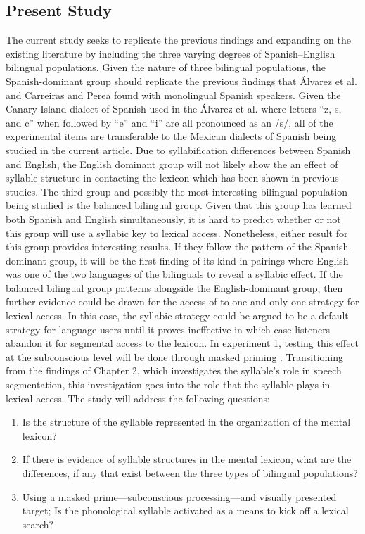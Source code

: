 \documentclass[
12pt, %
english, %
doublespacing, %
nolistspacing, %
liststotoc, %
headsepline, %
chapterinoneline, %
openany, %
]{DoctoralThesis}\usepackage[]{graphicx}\usepackage[]{color}
\begin{document}
\subsection{Present Study}
The current study seeks to replicate the previous findings and expanding on the existing literature by including the three varying degrees of Spanish–English bilingual populations. Given the nature of three bilingual populations, the Spanish-dominant group should replicate the previous findings that Álvarez et al. \parencite*{Alvarez2004-nd} and Carreiras and Perea \parencite*{Carreiras2002-mp} found with monolingual Spanish speakers. Given the Canary Island dialect of Spanish used in the Álvarez et al. \parencite*{Alvarez2004-nd} where letters “z, s, and c” when followed by “e” and “i” are all pronounced as an /s/, all of the experimental items are transferable to the Mexican dialects of Spanish being studied in the current article. Due to syllabification differences between Spanish and English, the English dominant group will not likely show the an effect of syllable structure in contacting the lexicon which has been shown in previous studies. The third group and possibly the most interesting bilingual population being studied is the balanced bilingual group. Given that this group has learned both Spanish and English simultaneously, it is hard to predict whether or not this group will use a syllabic key to lexical access. Nonetheless, either result for this group provides interesting results. If they follow the pattern of the Spanish-dominant group, it will be the first finding of its kind in pairings where English was one of the two languages of the bilinguals to reveal a syllabic effect. If the balanced bilingual group patterns alongside the English-dominant group, then further evidence could be drawn for the access of to one and only one strategy for lexical access. In this case, the syllabic strategy could be argued to be a default strategy for language users until it proves ineffective in which case listeners abandon it for segmental access to the lexicon. In experiment 1, testing this effect at the subconscious level will be done through masked priming \citep{Forster1984-sf}. 
Transitioning from the findings of Chapter 2, which investigates the syllable’s role in speech segmentation, this investigation goes into the role that the syllable plays in lexical access. The study will address the following questions:
\begin{enumerate}
\item{Is the structure of the syllable represented in the organization of the mental lexicon?}
\item{If there is evidence of syllable structures in the mental lexicon, what are the differences, if any that exist between the three types of bilingual populations?}
\item{Using a masked prime—subconscious processing—and visually presented target; Is the phonological syllable activated as a means to kick off a lexical search?}
\end{enumerate}
\end{document}
